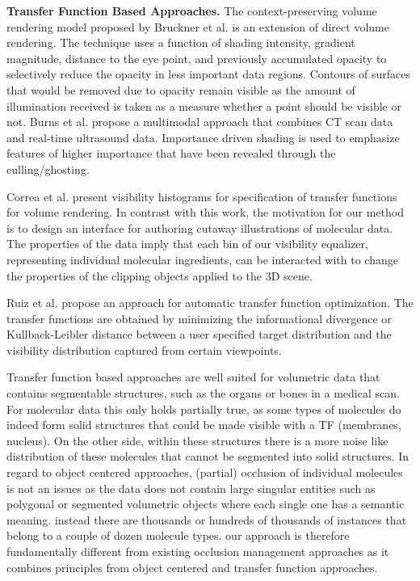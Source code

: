 \noindent
\textbf{Transfer Function Based Approaches.}
The context-preserving volume rendering model proposed by Bruckner et al. \cite{Bruckner05} is an extension of direct volume rendering. The technique uses a function of shading intensity, gradient magnitude, distance to the eye point, and previously accumulated opacity to selectively reduce the opacity in less important data regions. Contours of surfaces that would be removed due to opacity remain visible as the amount of illumination received is taken as a measure whether a point should be visible or not.
Burns et al. \cite{Burns07} propose a multimodal approach that combines CT scan data and real-time ultrasound data. Importance driven shading is used to emphasize features of higher importance that have been revealed through the culling/ghosting.

Correa et al. \cite{correa11} present visibility histograms for specification of transfer functions for volume rendering. In contrast with this work, the motivation for our method is to design an interface for authoring cutaway illustrations of molecular data. The properties of the data imply that each bin of our visibility equalizer, representing individual molecular ingredients, can be interacted with to change the properties of the clipping objects applied to the 3D scene.


Ruiz et al. \cite{ruiz11} propose an approach for automatic transfer function optimization. The transfer functions are obtained by minimizing the informational divergence or Kullback-Leibler distance between a user specified target distribution and the visibility distribution captured from certain viewpoints. 

Transfer function based approaches are well suited for volumetric data that contains segmentable structures, such as the organs or bones in a medical scan. For molecular data this only holds partially true, as some types of molecules do indeed form solid structures that could be made visible with a TF (membranes, nucleus). 	On the other side, within these structures there is a more noise like distribution of these molecules that cannot be segmented into solid structures. 
In regard to object centered approaches, (partial) occlusion of individual molecules is not an issues as the data does not contain large singular entities such as polygonal or segmented volumetric objects where each single one has a semantic meaning. instead there are thousands or hundreds of thousands of instances that belong to a couple of dozen molecule types.
 our approach is therefore fundamentally different from existing occlusion management approaches as it combines principles from object centered and transfer function approaches. 


